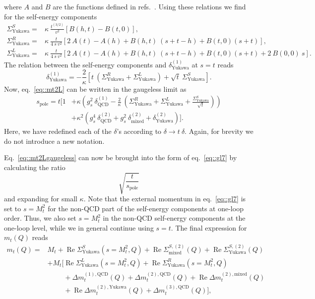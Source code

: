 \documentclass[a4paper,12pt]{book}
\begin{document}
where $A$ and $B$ are the functions defined in refs.\ \cite{martinmain, martinloops}. Using these relations we find for the self-energy components
\begin{align}
\Sigma^S_\text{Yukawa}={}& \kappa\>\frac{t^{(3/2)}}{v^2} \left[B(h,t)-B(t,0)\right],\\
\Sigma^R_\text{Yukawa}={}& \kappa\>\frac{t}{4\> s\>v^2} \left[2\> A(t) - A(h) + B(h,t) \>(s+t-h) + B(t,0)(s+t)\right],\\
\Sigma^L_\text{Yukawa}={}& \kappa\>\frac{t}{4\> s\>v^2} \left[2\> A(t) - A(h) + B(h,t) \>(s+t-h) + B(t,0)(s+t)+2\> B(0,0)\>s\right].
\end{align}
The relation between the self-energy components and $\delta^{(1)}_\text{Yukawa}$ at $s=t$ reads
\begin{equation}
\delta^{(1)}_\text{Yukawa} = -\frac{2}{\kappa}\left[t\>\left(\Sigma^R_\text{Yukawa}+\Sigma^L_\text{Yukawa}\right)+\sqrt{t}\>\Sigma^S_\text{Yukawa}\right].
\end{equation} 
Now, eq.\ \eqref{eq::mt2L} can be written in the gaugeless limit as
\begin{align}
\nonumber
s_\text{pole} = t \biggl[1&+ \kappa \left(g_s^2 \> \delta^{(1)}_\text{QCD} -\frac{2}{\kappa}\>\left(\Sigma^R_\text{Yukawa}+\Sigma^L_\text{Yukawa}+\frac{\Sigma^S_\text{Yukawa}}{\sqrt{t}}\right)\right)\\
\label{eq::mt2Lgaugeless}
&+\kappa^2 \left(g_s^4 \> \delta^{(2)}_\text{QCD}+ g_s^2 \> \delta^{(2)}_\text{mixed} + \delta^{(2)}_\text{Yukawa}\right)\biggr].
\end{align}
Here, we have redefined each of the $\delta$'s according to $\delta \rightarrow t\> \delta$. Again, for brevity we do not introduce a new notation.\par
Eq.\ \eqref{eq::mt2Lgaugeless} can now be brought into the form of eq.\ \eqref{eq::gl7} by calculating the ratio 
\begin{equation}
\sqrt{\frac{t}{s_\text{pole}}}
\end{equation} 
and expanding for small $\kappa$. Note that the external momentum in eq.\ \eqref{eq::gl7} is set to $s=M_t^2$ for the non-QCD part of the self-energy components at one-loop order. Thus, we also set  $s=M_t^2$ in the non-QCD self-energy components at the one-loop level, while we in general continue using $s=t$. The final expression for $m_t(Q)$ reads
\begin{align}
\nonumber
  m_t(Q) ={}& M_t + \operatorname{Re}\Sigma_\text{Yukawa}^S(s=M_t^2,Q)+ \operatorname{Re}\Sigma_\text{mixed}^{S,(2)}(Q)+ \operatorname{Re}\Sigma_\text{Yukawa}^{S,(2)}(Q)\\
  \nonumber
  &+ M_t \Big[\operatorname{Re}\Sigma_\text{Yukawa}^L(s=M_t^2,Q)+\operatorname{Re}\Sigma_\text{Yukawa}^R(s=M_t^2,Q)\\
  \nonumber
  &\phantom{+ M_t \Big[}+ \Delta m_t^{(1),\text{QCD}}(Q)+ \Delta m_t^{(2),\text{QCD}}(Q)+ \operatorname{Re}\Delta m_t^{(2),\text{mixed}}(Q)\\
  &\phantom{+ M_t \Big[}+ \operatorname{Re}\Delta m_t^{(2),\text{Yukawa}}(Q) + \Delta m_t^{(3),\text{QCD}}(Q)\Big],
\label{eq::gl7Yukawa}
\end{align}
\end{document}
